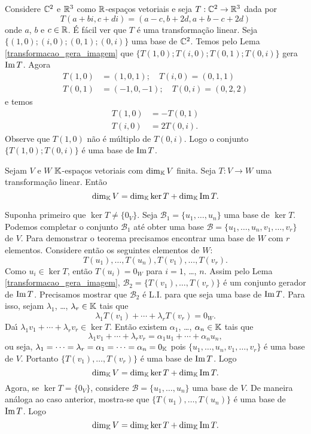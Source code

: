 \begin{exemplo}
	Considere $\mathbb{C}^2$ e $\mathbb{R}^3$ como $\mathbb{R}$-espa\c{c}os vetoriais e seja $T : \mathbb{C}^2 \to \mathbb{R}^3$ dada por
	\[
		T(a+bi, c+di) = (a - c, b + 2d, a + b - c + 2d)
	\]
	onde $a$, $b$ e $c \in \mathbb{R}$. \'E f\'acil ver que $T$ \'e uma transforma\c{c}\~ao linear. Seja $\{(1,0);(i,0);(0,1);(0,i)\}$ uma base de $\mathbb{C}^2$. Temos pelo Lema \ref{transformacao_gera_imagem} que $\{T(1,0);T(i,0);T(0,1);T(0,i)\}$ gera ${\rm Im\,} T$. Agora
	\begin{align*}
		T(1,0) &= (1,0,1);\quad T(i,0) = (0,1,1)\\
		T(0,1) &= (-1,0,-1);\quad T(0,i) = (0,2,2)
	\end{align*}
	e temos
	\begin{align*}
		T(1,0) &= -T(0,1)\\
		T(i,0) &= 2T(0,i).
	\end{align*}
	Observe que $T(1,0)$ n\~ao \'e m\'ultiplo de $T(0,i)$. Logo o conjunto $\{T(1,0); T(0,i)\}$ \'e uma base de ${\rm Im\,} T$.
\end{exemplo}

\begin{teorema}\label{teorema_do_nucleo_e_da_imagem}
	Sejam $V$ e $W$ $\mathbb{K}$-espa\c{c}os vetoriais com $\dim_{\mathbb{K}}V$ finita. Seja $T : V \to W$ uma transforma\c{c}\~ao linear. Ent\~ao
	\[
		\dim_{\mathbb{K}}V = \dim_{\mathbb{K}}\ker T + \dim_{\mathbb{K}}{\rm Im\,} T.
	\]
\end{teorema}
\begin{prova}
	Suponha primeiro que $\ker T \ne \{0_V\}$. Seja $\mathcal{B}_1 = \{u_1, \dots, u_n\}$ uma base de $\ker T$. Podemos completar o conjunto $\mathcal{B}_1$ at\'e obter uma base $\mathcal{B} = \{u_1, \dots, u_n, v_1, \dots, v_r\}$ de $V$. Para demonstrar o teorema precisamos encontrar uma base de $W$ com $r$ elementos. Considere ent\~ao os seguintes elementos de $W$:
	\[
		T(u_1), \dots, T(u_n), T(v_1), \dots, T(v_r).
	\]
	Como $u_i \in \ker T$, ent\~ao $T(u_i) = 0_W$ para $i = 1$, \dots, $n$. Assim pelo Lema \ref{transformacao_gera_imagem}, $\mathcal{B}_2 = \{T(v_1), \dots, T(v_r)\}$ \'e um conjunto gerador de ${\rm Im\,} T$. Precisamos mostrar que $\mathcal{B}_2$ \'e L.I. para que seja uma base de ${\rm Im\,} T$. Para isso, sejam $\lambda_1$, \dots, $\lambda_r \in \mathbb{K}$ tais que
	\[
		\lambda_1T(v_1) + \cdots + \lambda_rT(v_r) = 0_W.
	\]
	Da{\'\i} $\lambda_1v_1 + \cdots + \lambda_rv_r \in \ker T$. Ent\~ao existem $\alpha_1$, \dots, $\alpha_n \in \mathbb{K}$ tais que
	\[
		\lambda_1v_1 + \cdots + \lambda_rv_r = \alpha_1u_1 + \cdots + \alpha_nu_n,
	\]
	ou seja, $\lambda_1 = \cdots = \lambda_r = \alpha_1 = \cdots = \alpha_n = 0_{\mathbb{K}}$ pois $\{u_1, \dots, u_n, v_1, \dots, v_r\}$ \'e uma base de $V$. Portanto $\{T(v_1), \dots, T(v_r)\}$ \'e uma base de ${\rm Im\,} T$. Logo
	\[
		\dim_{\mathbb{K}}V = \dim_{\mathbb{K}}\ker T + \dim_{\mathbb{K}}{\rm Im\,} T.
	\]
	Agora, se $\ker T = \{0_V\}$, considere $\mathcal{B} = \{u_1, \dots, u_n\}$ uma base de $V$. De maneira an\'aloga ao caso anterior, mostra-se que $\{T(u_1), \dots, T(u_n)\}$ \'e uma base de ${\rm Im\,} T$. Logo
	\[
		\dim_{\mathbb{K}}V = \dim_{\mathbb{K}}\ker T + \dim_{\mathbb{K}}{\rm Im\,} T.
	\]
\end{prova}

